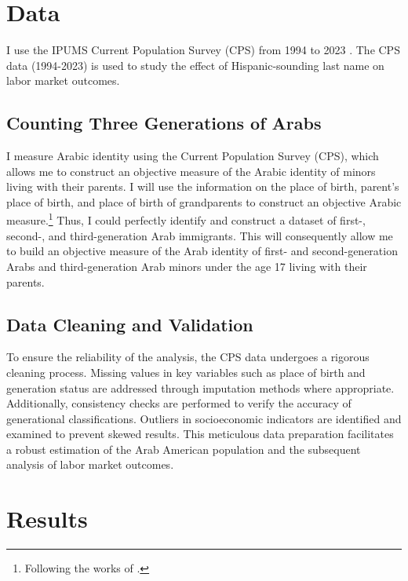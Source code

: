 \section{Data}\label{sec:data}

I use the IPUMS Current Population Survey (CPS) from 1994 to 2023 \autocite{floodsarahIntegratedPublicUse2021a}. The CPS data (1994-2023) is used to study the effect of Hispanic-sounding last name on labor market outcomes. 

\subsection{Counting Three Generations of Arabs}\label{subsec:cps}

I measure Arabic identity using the Current Population Survey (CPS), which allows me to construct an objective measure of the Arabic identity of minors living with their parents. I will use the information on the place of birth, parent's place of birth, and place of birth of grandparents to construct an objective Arabic measure.\footnote{Following the works of \textcite{antmanEthnicAttritionObserved2016}.} Thus, I could perfectly identify and construct a dataset of first-, second-, and third-generation Arab immigrants. This will consequently allow me to build an objective measure of the Arab identity of first- and second-generation Arabs and third-generation Arab minors under the age 17 living with their parents. 
\subsection{Data Cleaning and Validation}\label{subsec:data_cleaning}

To ensure the reliability of the analysis, the CPS data undergoes a rigorous cleaning process. Missing values in key variables such as place of birth and generation status are addressed through imputation methods where appropriate. Additionally, consistency checks are performed to verify the accuracy of generational classifications. Outliers in socioeconomic indicators are identified and examined to prevent skewed results. This meticulous data preparation facilitates a robust estimation of the Arab American population and the subsequent analysis of labor market outcomes.

\section{Results}\label{sec:results}

